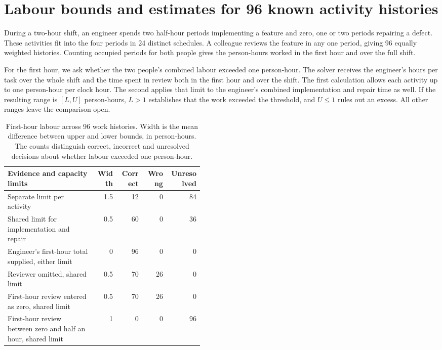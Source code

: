 \section{Labour bounds and estimates for 96 known activity histories}
\label{sec:known-labour}

During a two-hour shift, an engineer spends two half-hour periods implementing a feature and zero, one or two periods repairing a defect. These activities fit into the four periods in 24 distinct schedules. A colleague reviews the feature in any one period, giving 96 equally weighted histories. Counting occupied periods for both people gives the person-hours worked in the first hour and over the full shift.

For the first hour, we ask whether the two people's combined labour exceeded one person-hour. The solver receives the engineer's hours per task over the whole shift and the time spent in review both in the first hour and over the shift. The first calculation allows each activity up to one person-hour per clock hour. The second applies that limit to the engineer's combined implementation and repair time as well. If the resulting range is $[L,U]$ person-hours, $L>1$ establishes that the work exceeded the threshold, and $U\leq1$ rules out an excess. All other ranges leave the comparison open.

\begin{table}[htbp]
\centering\small
\caption{First-hour labour across 96 work histories. Width is the mean difference between upper and lower bounds, in person-hours. The counts distinguish correct, incorrect and unresolved decisions about whether labour exceeded one person-hour.}
\label{tab:known-hours}
\begin{tabular}{@{}p{0.45\linewidth}rrrr@{}}
\hline
Evidence and capacity limits & Width & Correct & Wrong & Unresolved \\
\hline
Separate limit per activity                      & 1.5 & 12 & 0 & 84 \\
Shared limit for implementation and repair        & 0.5 & 60 & 0 & 36 \\
Engineer's first-hour total supplied, either limit & 0 & 96 & 0 & 0 \\
Reviewer omitted, shared limit                    & 0.5 & 70 & 26 & 0 \\
First-hour review entered as zero, shared limit   & 0.5 & 70 & 26 & 0 \\
First-hour review between zero and half an hour, shared limit & 1 & 0 & 0 & 96 \\
\hline
\end{tabular}
\end{table}

